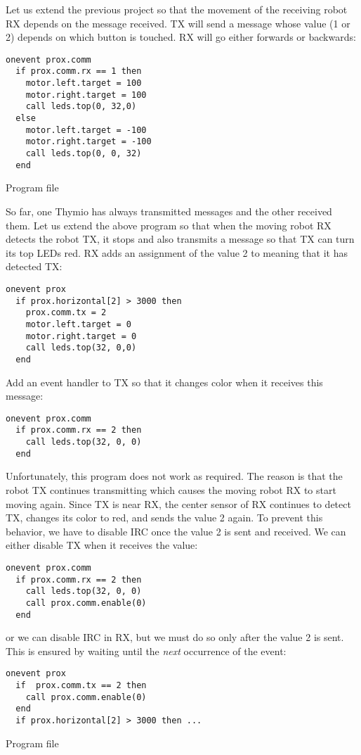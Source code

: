 Let us extend the previous project so that the movement of the receiving
robot RX depends on the message received. TX will send a message whose
value (1 or 2) depends on which button is touched. RX will go either
forwards or backwards:

\begin{verbatim}
onevent prox.comm
  if prox.comm.rx == 1 then
    motor.left.target = 100
    motor.right.target = 100
    call leds.top(0, 32,0)
  else	
    motor.left.target = -100
    motor.right.target = -100
    call leds.top(0, 0, 32)
  end
\end{verbatim}

{\raggedleft \hfill Program file }


So far, one Thymio has always transmitted messages and the other
received them. Let us extend the above program so that when the moving
robot RX detects the robot TX, it stops and also transmits a message so
that TX can turn its top LEDs red. RX adds an assignment of the value 2
to  meaning that it has detected TX:

\begin{verbatim}
onevent prox
  if prox.horizontal[2] > 3000 then
    prox.comm.tx = 2
    motor.left.target = 0
    motor.right.target = 0
    call leds.top(32, 0,0)
  end
\end{verbatim}

Add an event handler to TX so that it changes color when it receives this
message:

\begin{verbatim}
onevent prox.comm
  if prox.comm.rx == 2 then
    call leds.top(32, 0, 0)  	
  end
\end{verbatim}

Unfortunately, this program does not work as required. The reason is
that the robot TX continues transmitting which causes the moving robot
RX to start moving again. Since TX is near RX, the center sensor of RX
continues to detect TX, changes its color to red, and sends the value 2
again. To prevent this behavior, we have to disable IRC once the value 2
is sent and received. We can either disable TX when it receives the
value:

\begin{verbatim}
onevent prox.comm
  if prox.comm.rx == 2 then
    call leds.top(32, 0, 0)  	
    call prox.comm.enable(0)
  end
\end{verbatim}

or we can disable IRC in RX, but we must do so only after the value 2 is
sent. This is ensured by waiting until the \emph{next} occurrence of the
 event:

\begin{verbatim}
onevent prox
  if  prox.comm.tx == 2 then
    call prox.comm.enable(0)
  end
  if prox.horizontal[2] > 3000 then ...
\end{verbatim}

{\raggedleft \hfill Program file }
